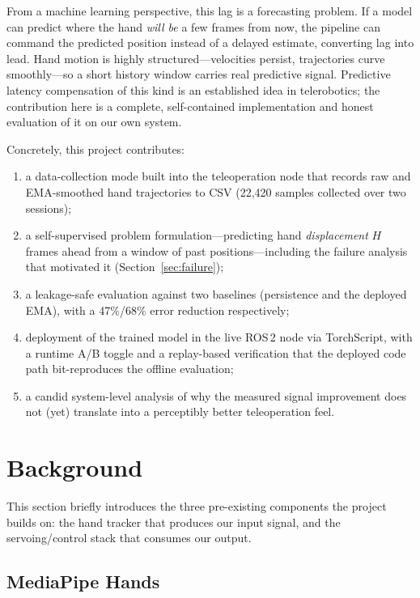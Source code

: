 \documentclass[11pt,a4paper]{article}
\begin{document}
From a machine learning perspective, this lag is a forecasting problem. If a
model can predict where the hand \emph{will be} a few frames from now, the
pipeline can command the predicted position instead of a delayed estimate,
converting lag into lead. Hand motion is highly structured---velocities persist,
trajectories curve smoothly---so a short history window carries real predictive
signal. Predictive latency compensation of this kind is an established idea in
telerobotics; the contribution here is a complete, self-contained
implementation and honest evaluation of it on our own system.

Concretely, this project contributes:
\begin{enumerate}
  \item a data-collection mode built into the teleoperation node that records
        raw and EMA-smoothed hand trajectories to CSV (22{,}420 samples
        collected over two sessions);
  \item a self-supervised problem formulation---predicting hand
        \emph{displacement} $H$ frames ahead from a window of past
        positions---including the failure analysis that motivated it
        (Section~\ref{sec:failure});
  \item a leakage-safe evaluation against two baselines (persistence and the
        deployed EMA), with a 47\%/68\% error reduction respectively;
  \item deployment of the trained model in the live ROS\,2 node via
        TorchScript, with a runtime A/B toggle and a replay-based
        verification that the deployed code path bit-reproduces the offline
        evaluation;
  \item a candid system-level analysis of why the measured signal improvement
        does not (yet) translate into a perceptibly better teleoperation feel.
\end{enumerate}

\section{Background}
\label{sec:background}

This section briefly introduces the three pre-existing components the project
builds on: the hand tracker that produces our input signal, and the
servoing/control stack that consumes our output.

\subsection{MediaPipe Hands}
\end{document}
